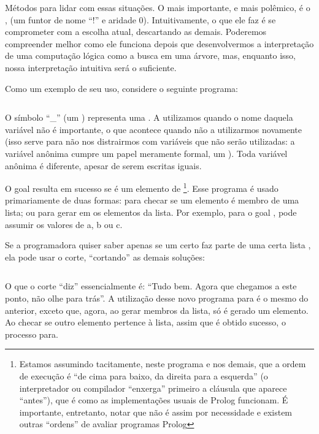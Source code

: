 \documentclass{article}
\begin{document}
Métodos para lidar com essas situações. O mais
importante, e mais polêmico, é o ,  (um
funtor de nome ``!'' e aridade 0). Intuitivamente, o que ele faz é se
comprometer com a escolha atual, descartando as demais. Poderemos
compreender melhor como ele funciona depois que desenvolvermos a
interpretação de uma computação lógica como a busca em uma árvore,
mas, enquanto isso, nossa interpretação intuitiva será o suficiente.

Como um exemplo de seu uso, considere o seguinte programa:

\begin{listing}
  \inputminted{prolog}{../Exemplos/Cap4/prog1_member.pl}
  \caption{Member 0}
\end{listing}

O símbolo ``\_'' (um ) representa uma . A
utilizamos quando o nome daquela variável não é importante, o que
acontece quando não a utilizarmos novamente (isso serve para não nos
distrairmos com variáveis que não serão utilizadas: a variável anônima
cumpre um papel meramente formal, um ). Toda
variável anônima é diferente, apesar de serem escritas iguais.

O goal  resulta em sucesso se  é um
elemento de \footnote{Estamos assumindo tacitamente, neste
  programa e nos demais, que a ordem de execução é ``de cima para
  baixo, da direita para a esquerda'' (o interpretador ou compilador ``enxerga''
  primeiro a cláusula que aparece ``antes''), que é como as
  implementações usuais de Prolog funcionam. É importante, entretanto,
  notar que não é assim por necessidade e existem outras ``ordens'' de
  avaliar programas Prolog}. Esse programa é usado primariamente de
duas formas: para checar se um elemento é membro de uma lista; ou para
gerar em  os elementos da lista. Por exemplo, para o goal
,  pode assumir os valores de a,
b ou c.

Se a programadora quiser saber apenas se um certo  faz parte de
uma certa lista , ela pode usar o corte, ``cortando'' as
demais soluções:

\begin{listing}
  \inputminted{prolog}{../Exemplos/Cap4/prog2_member2.pl}
  \caption{Member 1}
\end{listing}

O que o corte ``diz'' essencialmente é: ``Tudo bem. Agora que chegamos
a este ponto, não olhe para trás''. A utilização desse novo programa
para  é o mesmo do anterior, exceto que, agora, ao
gerar membros da lista, só é gerado um elemento. Ao checar se outro
elemento pertence à lista, assim que é obtido sucesso, o processo
para.
\end{document}
